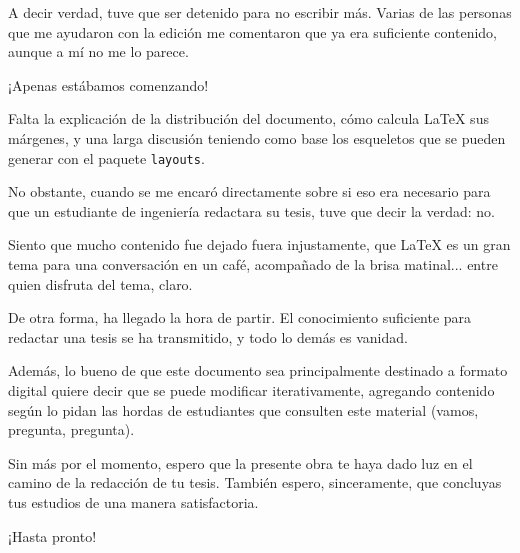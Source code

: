 


A decir verdad, tuve que ser detenido para no escribir más. Varias de las personas que me ayudaron con la edición me comentaron que ya era suficiente contenido, aunque a mí no me lo parece.

¡Apenas estábamos comenzando!

Falta la explicación de la distribución del documento, cómo calcula \LaTeX{} sus márgenes, y una larga discusión teniendo como base los esqueletos que se pueden generar con el paquete \texttt{layouts}.

No obstante, cuando se me encaró directamente sobre si eso era necesario para que un estudiante de ingeniería redactara su tesis, tuve que decir la verdad: no.

Siento que mucho contenido fue dejado fuera injustamente, que \LaTeX{} es un gran tema para una conversación en un café, acompañado de la brisa matinal... entre quien disfruta del tema, claro.

De otra forma, ha llegado la hora de partir. El conocimiento suficiente para redactar una tesis se ha transmitido, y todo lo demás es vanidad.

Además, lo bueno de que este documento sea principalmente destinado a formato digital quiere decir que se puede modificar iterativamente, agregando contenido según lo pidan las hordas de estudiantes que consulten este material (vamos, pregunta, pregunta).

Sin más por el momento, espero que la presente obra te haya dado luz en el camino de la redacción de tu tesis. También espero, sinceramente, que concluyas tus estudios de una manera satisfactoria.

¡Hasta pronto!